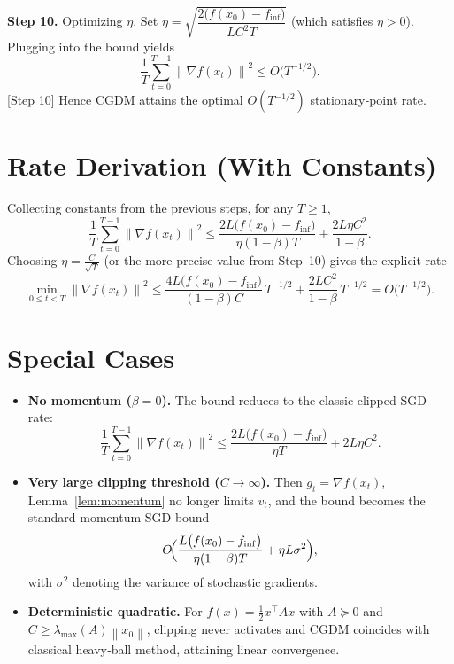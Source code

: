 \documentclass[11pt]{article}
\newcommand{\norm}[1]{\left\lVert #1\right\rVert}
\newcommand{\grad}{\nabla}
\begin{document}
\noindent\textbf{Step 10.} Optimizing $\eta$.
Set $\eta = \sqrt{\dfrac{2\bigl(f(x_0)-f_{\inf}\bigr)}{LC^2 T}}$ (which satisfies $\eta>0$). Plugging into the bound yields
\[
    \frac{1}{T}\sum_{t=0}^{T-1}\norm{\grad f(x_t)}^2 \le
    O\!\bigl(T^{-1/2}\bigr) .
\]
[Step 10] Hence CGDM attains the optimal $O(T^{-1/2})$ stationary‑point rate.

\section*{Rate Derivation (With Constants)}
Collecting constants from the previous steps, for any $T\ge1$,
\[
    \boxed{
    \frac{1}{T}\sum_{t=0}^{T-1}\norm{\grad f(x_t)}^2
    \le
    \frac{2L\bigl(f(x_0)-f_{\inf}\bigr)}{\eta(1-\beta)T}
    +\frac{2L\eta C^2}{1-\beta}
    } .
\]
Choosing $\eta = \frac{C}{\sqrt{T}}$ (or the more precise value from Step~10) gives the explicit rate
\[
    \min_{0\le t<T}\norm{\grad f(x_t)}^2 \le
    \frac{4L\bigl(f(x_0)-f_{\inf}\bigr)}{(1-\beta)C}\,T^{-1/2}
    + \frac{2L C^2}{1-\beta}\,T^{-1/2}
    = O\!\bigl(T^{-1/2}\bigr).
\]

\section*{Special Cases}
\begin{itemize}
\item \textbf{No momentum ($\beta=0$).} The bound reduces to the classic clipped SGD rate:
\[
    \frac{1}{T}\sum_{t=0}^{T-1}\norm{\grad f(x_t)}^2
    \le \frac{2L\bigl(f(x_0)-f_{\inf}\bigr)}{\eta T}+2L\eta C^2 .
\]

\item \textbf{Very large clipping threshold ($C\to\infty$).} Then $g_t=\grad f(x_t)$, Lemma~\ref{lem:momentum} no longer limits $v_t$, and the bound becomes the standard momentum SGD bound
\[
    O\!\Bigl(\frac{L\bigl(f(x_0)-f_{\inf}\bigr)}{\eta(1-\beta)T}+\eta L\sigma^2\Bigr),
\]
with $\sigma^2$ denoting the variance of stochastic gradients.

\item \textbf{Deterministic quadratic.} For $f(x)=\tfrac{1}{2}x^\top A x$ with $A\succeq 0$ and $C\ge \lambda_{\max}(A)\norm{x_0}$, clipping never activates and CGDM coincides with classical heavy‑ball method, attaining linear convergence.
\end{itemize}
\end{document}
